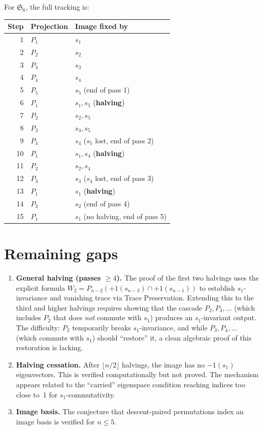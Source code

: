 \documentclass[11pt]{article}
\theoremstyle{definition}
\theoremstyle{remark}
\newcommand{\Sym}{\mathfrak{S}}
\begin{document}
\noindent For $\Sym_6$, the full tracking is:
\begin{center}
\small
\begin{tabular}{r|l|l}
Step & Projection & Image fixed by \\
\hline
1 & $P_1$ & $s_1$ \\
2 & $P_2$ & $s_2$ \\
3 & $P_3$ & $s_3$ \\
4 & $P_4$ & $s_4$ \\
5 & $P_5$ & $s_5$ \quad (end of pass 1) \\
\hline
6 & $P_1$ & $s_1, s_5$ \quad (\textbf{halving}) \\
7 & $P_2$ & $s_2, s_5$ \\
8 & $P_3$ & $s_3, s_5$ \\
9 & $P_4$ & $s_4$ \quad ($s_5$ lost, end of pass 2) \\
\hline
10 & $P_1$ & $s_1, s_4$ \quad (\textbf{halving}) \\
11 & $P_2$ & $s_2, s_4$ \\
12 & $P_3$ & $s_3$ \quad ($s_4$ lost, end of pass 3) \\
\hline
13 & $P_1$ & $s_1$ \quad (\textbf{halving}) \\
14 & $P_2$ & $s_2$ \quad (end of pass 4) \\
\hline
15 & $P_1$ & $s_1$ \quad (no halving, end of pass 5) \\
\end{tabular}
\end{center}


\section{Remaining gaps}

\begin{enumerate}
  \item \textbf{General halving (passes $\ge 4$).} The proof of the
    first two halvings uses the explicit formula
    $W_2 = P_{n-2}(+1(s_{n-3}) \cap +1(s_{n-1}))$ to establish
    $s_1$-invariance and vanishing trace via Trace Preservation.
    Extending this to the third and higher halvings requires showing
    that the cascade $P_2, P_3, \dots$ (which includes $P_2$ that
    does \emph{not} commute with $s_1$) produces an $s_1$-invariant
    output. The difficulty: $P_2$ temporarily breaks $s_1$-invariance,
    and while $P_3, P_4, \dots$ (which commute with $s_1$) should
    ``restore'' it, a clean algebraic proof of this restoration
    is lacking.

  \item \textbf{Halving cessation.} After $\lfloor n/2 \rfloor$
    halvings, the image has no $-1(s_1)$ eigenvectors. This is
    verified computationally but not proved. The mechanism appears
    related to the ``carried'' eigenspace condition reaching
    indices too close to~1 for $s_1$-commutativity.

  \item \textbf{Image basis.} The conjecture that descent-paired
    permutations index an image basis is verified for $n \le 5$.
\end{enumerate}
\end{document}
